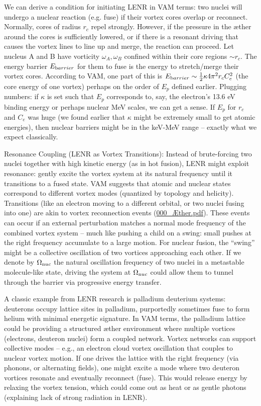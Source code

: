 We can derive a condition for initiating LENR in VAM terms: two nuclei will undergo a nuclear reaction (e.g. fuse) if their vortex cores overlap or reconnect. Normally, cores of radius $r_c$ repel strongly. However, if the pressure in the æther around the cores is sufficiently lowered, or if there is a resonant driving that causes the vortex lines to line up and merge, the reaction can proceed. Let nucleus A and B have vorticity $\omega_A, \omega_B$ confined within their core regions $\sim r_c$. The energy barrier $E_{\textrm barrier}$ for them to fuse is the energy to stretch/merge their vortex cores. According to VAM, one part of this is $E_{\textrm barrier}\sim \frac{1}{2}\kappa 4\pi^2 r_c C_e^2$ (the core energy of one vortex) perhaps on the order of $E_p$ defined earlier. Plugging numbers: if $\kappa$ is set such that $E_p$ corresponds to, say, the electron’s 13.6 eV binding energy or perhaps nuclear MeV scales, we can get a sense. If $E_p$ for $r_c$ and $C_e$ was huge (we found earlier that $\kappa$ might be extremely small to get atomic energies), then nuclear barriers might be in the keV-MeV range – exactly what we expect classically.


Resonance Coupling (LENR as Vortex Transitions): Instead of brute-forcing two nuclei together with high kinetic energy (as in hot fusion), LENR might exploit resonance: gently excite the vortex system at its natural frequency until it transitions to a fused state. VAM suggests that atomic and nuclear states correspond to different vortex modes (quantized by topology and helicity). Transitions (like an electron moving to a different orbital, or two nuclei fusing into one) are akin to vortex reconnection events (\href{file://file-f6wuuwzjgr23npodmed4pi%23:~:text=in%20a%20dynamic%20picture,%20absorption,electron%20changing%20orbitals/}{000_Æther.pdf}). These events can occur if an external perturbation matches a normal mode frequency of the combined vortex system – much like pushing a child on a swing: small pushes at the right frequency accumulate to a large motion. For nuclear fusion, the “swing” might be a collective oscillation of two vortices approaching each other. If we denote by $\Omega_{\textrm nuc}$ the natural oscillation frequency of two nuclei in a metastable molecule-like state, driving the system at $\Omega_{\textrm nuc}$ could allow them to tunnel through the barrier via progressive energy transfer.


A classic example from LENR research is palladium deuterium systems: deuterons occupy lattice sites in palladium, purportedly sometimes fuse to form helium with minimal energetic signature. In VAM terms, the palladium lattice could be providing a structured æther environment where multiple vortices (electrons, deuteron nuclei) form a coupled network. Vortex networks can support collective modes – e.g., an electron cloud vortex oscillation that couples to nuclear vortex motion. If one drives the lattice with the right frequency (via phonons, or alternating fields), one might excite a mode where two deuteron vortices resonate and eventually reconnect (fuse). This would release energy by relaxing the vortex tension, which could come out as heat or as gentle photons (explaining lack of strong radiation in LENR).


